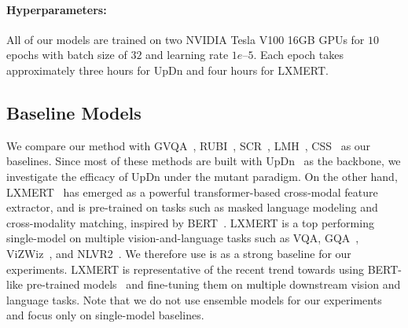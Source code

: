     
    \paragraph{Hyperparameters:}
    All of our models are trained on two NVIDIA Tesla V100 16GB GPUs for $10$ epochs with batch size of $32$ and learning rate $1e\text{--}5$.
    Each epoch takes approximately three hours for UpDn and four hours for LXMERT.
    
    
    
    
    \subsection{Baseline Models}
    We compare our method with GVQA~\citep{agrawal2018don}, RUBI~\citep{cadene2019rubi}, SCR~\citep{wu2019self}, LMH~\citep{clark2019don}, CSS~\citep{chen2020counterfactual} as our baselines.
    Since most of these methods are built with UpDn~\citep{anderson2018bottom} as the backbone, we investigate the efficacy of UpDn under the mutant paradigm.
    On the other hand, LXMERT~\citep{tan2019lxmert} has emerged as a powerful transformer-based cross-modal feature extractor, and is pre-trained on tasks such as masked language modeling and cross-modality matching, inspired by BERT~\citep{devlin2018bert}.
    LXMERT is a top performing single-model on multiple vision-and-language tasks such as VQA, GQA~\citep{hudson2019gqa}, ViZWiz~\citep{bigham2010vizwiz}, and NLVR2~\citep{suhr2019corpus}.
    We therefore use is as a strong baseline for our experiments.
    LXMERT is representative of the recent trend towards using BERT-like pre-trained models~\citep{lu2019vilbert,su2019vl,li2020unicoder,chen2019uniter} and fine-tuning them on multiple downstream vision and language tasks.
    Note that we do not use ensemble models for our experiments and focus only on single-model baselines.

    
